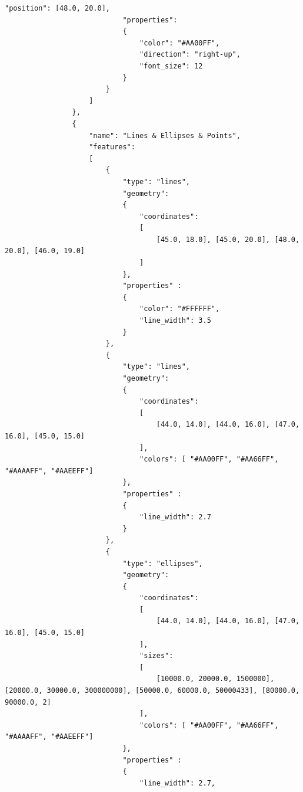 \begin{lstlisting}[basicstyle=\small\ttfamily]
                            "position": [48.0, 20.0],
                            "properties":
                            {
                                "color": "#AA00FF",
                                "direction": "right-up",
                                "font_size": 12
                            }
                        }                        
                    ]
                },
                {
                    "name": "Lines & Ellipses & Points",
                    "features":
                    [
                        {
                            "type": "lines",
                            "geometry":
                            {
                                "coordinates": 
                                [
                                    [45.0, 18.0], [45.0, 20.0], [48.0, 20.0], [46.0, 19.0]
                                ]
                            },
                            "properties" :
                            {
                                "color": "#FFFFFF",
                                "line_width": 3.5
                            }
                        },
                        {
                            "type": "lines",
                            "geometry":
                            {
                                "coordinates": 
                                [
                                    [44.0, 14.0], [44.0, 16.0], [47.0, 16.0], [45.0, 15.0]
                                ],
                                "colors": [ "#AA00FF", "#AA66FF", "#AAAAFF", "#AAEEFF"]
                            },
                            "properties" :
                            {
                                "line_width": 2.7
                            }
                        },
                        {
                            "type": "ellipses",
                            "geometry":
                            {
                                "coordinates": 
                                [
                                    [44.0, 14.0], [44.0, 16.0], [47.0, 16.0], [45.0, 15.0]
                                ],
                                "sizes": 
                                [
                                    [10000.0, 20000.0, 1500000], [20000.0, 30000.0, 300000000], [50000.0, 60000.0, 50000433], [80000.0, 90000.0, 2]
                                ],
                                "colors": [ "#AA00FF", "#AA66FF", "#AAAAFF", "#AAEEFF"]
                            },
                            "properties" :
                            {
                                "line_width": 2.7,

\end{lstlisting}

